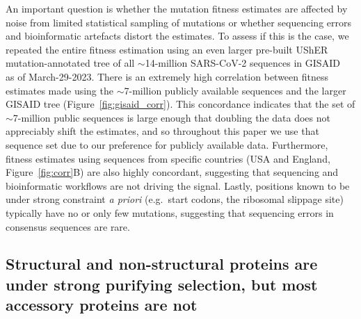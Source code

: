 \documentclass[9pt,twocolumn,twoside]{gsajnl_modified}
\begin{document}
An important question is whether the mutation fitness estimates are affected by noise from limited statistical sampling of mutations or whether sequencing errors and bioinformatic artefacts distort the estimates.
To assess if this is the case, we repeated the entire fitness estimation using an even larger pre-built UShER mutation-annotated tree of all $\sim$14-million SARS-CoV-2 sequences in GISAID~\cite{shu2017gisaid} as of March-29-2023.
There is an extremely high correlation between fitness estimates made using the $\sim$7-million publicly available sequences and the larger GISAID tree (Figure~\ref{fig:gisaid_corr}).
This concordance indicates that the set of $\sim$7-million public sequences is large enough that doubling the data does not appreciably shift the estimates, and so throughout this paper we use that sequence set due to our preference for publicly available data.
Furthermore, fitness estimates using sequences from specific countries (USA and England, Figure~\ref{fig:corr}B) are also highly concordant, suggesting that sequencing and bioinformatic workflows are not driving the signal.
Lastly, positions known to be under strong constraint {\it a priori} (e.g.~start codons, the ribosomal slippage site) typically have no or only few mutations, suggesting that sequencing errors in consensus sequences are rare.

\subsection*{Structural and non-structural proteins are under strong purifying selection, but most accessory proteins are not}
\end{document}
